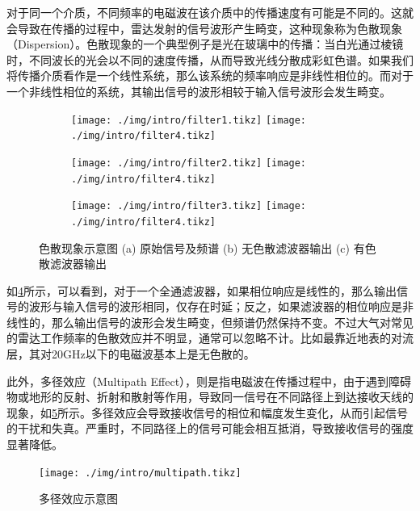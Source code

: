 对于同一个介质，不同频率的电磁波在该介质中的传播速度有可能是不同的。这就会导致在传播的过程中，雷达发射的信号波形产生畸变，这种现象称为色散现象（Dispersion）。色散现象的一个典型例子是光在玻璃中的传播：当白光通过棱镜时，不同波长的光会以不同的速度传播，从而导致光线分散成彩虹色谱。如果我们将传播介质看作是一个线性系统，那么该系统的频率响应是非线性相位的。而对于一个非线性相位的系统，其输出信号的波形相较于输入信号波形会发生畸变。
\begin{figure}[htb!]
    \centering
    \begin{subfigure}{.3\textwidth}
        \centering
        \texttt{[image: ./img/intro/filter1.tikz]}
        \texttt{[image: ./img/intro/filter4.tikz]}
        \caption{}
        \label{fig_chp1_filter_1}
    \end{subfigure}
    \begin{subfigure}{.3\textwidth}
        \centering
        \texttt{[image: ./img/intro/filter2.tikz]}
        \texttt{[image: ./img/intro/filter4.tikz]}
        \caption{}
        \label{fig_chp1_filter_2}
    \end{subfigure}
    \begin{subfigure}{.3\textwidth}
        \centering
        \texttt{[image: ./img/intro/filter3.tikz]}
        \texttt{[image: ./img/intro/filter4.tikz]}
        \caption{}
        \label{fig_chp1_filter_3}
    \end{subfigure}
    \caption{色散现象示意图 (a) 原始信号及频谱 (b) 无色散滤波器输出 (c) 有色散滤波器输出}
    \label{fig_chp1_filter}
\end{figure}

如\cref{fig_chp1_filter}所示，可以看到，对于一个全通滤波器，如果相位响应是线性的，那么输出信号的波形与输入信号的波形相同，仅存在时延；反之，如果滤波器的相位响应是非线性的，那么输出信号的波形会发生畸变，但频谱仍然保持不变。不过大气对常见的雷达工作频率的色散效应并不明显，通常可以忽略不计。比如最靠近地表的对流层，其对20GHz以下的电磁波基本上是无色散的。

此外，多径效应（Multipath Effect），则是指电磁波在传播过程中，由于遇到障碍物或地形的反射、折射和散射等作用，导致同一信号在不同路径上到达接收天线的现象，如\cref{fig_chp1_multipath}所示。多径效应会导致接收信号的相位和幅度发生变化，从而引起信号的干扰和失真。严重时，不同路径上的信号可能会相互抵消，导致接收信号的强度显著降低。

\begin{figure}[htb!]
    \centering
    \texttt{[image: ./img/intro/multipath.tikz]}
    \caption{多径效应示意图}
    \label{fig_chp1_multipath}
\end{figure}



